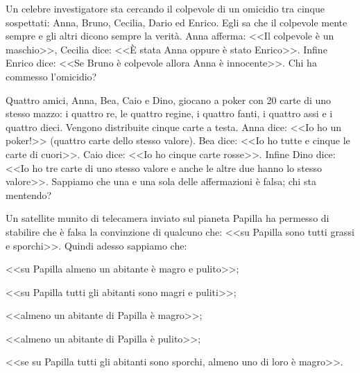 \begin{esercizio}
\label{ese:1.22}
Un celebre investigatore sta cercando il colpevole di un omicidio tra 
cinque sospettati: Anna, Bruno, Cecilia, Dario ed Enrico. Egli sa che 
il colpevole mente sempre e gli altri dicono sempre la verità. Anna 
afferma: <<Il colpevole è un maschio>>, Cecilia dice: <<\`E stata 
Anna oppure è stato Enrico>>. Infine Enrico dice: <<Se Bruno è 
colpevole allora Anna è innocente>>. Chi ha commesso l'omicidio?
\end{esercizio}

\begin{esercizio}
\label{ese:1.23}
Quattro amici, Anna, Bea, Caio e Dino, giocano a poker con 20 carte 
di uno stesso mazzo: i quattro re, le quattro regine, i quattro fanti, 
i quattro assi e i quattro dieci. Vengono distribuite cinque carte a 
testa. Anna dice: <<Io ho un poker!>> (quattro carte dello stesso 
valore). Bea dice: <<Io ho tutte e cinque le carte di cuori>>. Caio 
dice: <<Io ho cinque carte rosse>>. Infine Dino dice: <<Io ho tre 
carte di uno stesso valore e anche le altre due hanno lo stesso 
valore>>. Sappiamo che una e una sola delle affermazioni è falsa; chi 
sta mentendo?
\end{esercizio}

\begin{esercizio}
\label{ese:1.24}
Un satellite munito di telecamera inviato sul pianeta Papilla ha 
permesso di stabilire che è falsa la convinzione di qualcuno che: 
<<su Papilla sono tutti grassi e sporchi>>. Quindi adesso sappiamo 
che:
\begin{enumeratea}
\item <<su Papilla almeno un abitante è magro e pulito>>;
\item <<su Papilla tutti gli abitanti sono magri e puliti>>;
\item <<almeno un abitante di Papilla è magro>>;
\item <<almeno un abitante di Papilla è pulito>>;
\item <<se su Papilla tutti gli abitanti sono sporchi, almeno uno di 
loro è magro>>.
\end{enumeratea}
\end{esercizio}


